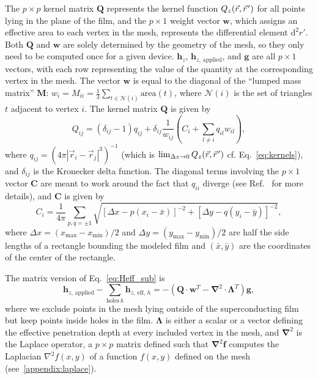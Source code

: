 \documentclass[final,3p,times,twocolumn]{elsarticle}
\newcommand{\pvec}[1]{\vec{#1}\mkern2mu\vphantom{#1}}
\newcounter{bla}
\begin{document}
The $p\times p$ kernel matrix $\mathbf{Q}$ represents the kernel function $Q_z(\vec{r},\pvec{r}')$ for all points lying in the plane of the film, and the $p\times 1$ weight vector $\mathbf{w}$, which assigns an effective area to each vertex in the mesh, represents the differential element $\mathrm{d}^2r'$. Both $\mathbf{Q}$ and $\mathbf{w}$ are solely determined by the geometry of the mesh, so they only need to be computed once for a given device. $\mathbf{h}_z$, $\mathbf{h}_{z,\,\mathrm{applied}}$, and $\mathbf{g}$ are all $p\times 1$ vectors, with each row representing the value of the quantity at the
corresponding vertex in the mesh. The vector $\mathbf{w}$ is equal to the diagonal of the ``lumped mass matrix'' $\mathbf{M}$: $w_i=M_{ii} = \frac{1}{3}\sum_{t\in\mathcal{N}(i)}\mathrm{area}(t)$,
where $\mathcal{N}(i)$ is the set of triangles $t$ adjacent to vertex $i$. The kernel matrix $\mathbf{Q}$ is given by
\begin{equation}
    \label{eq:kernel_matrix}
    Q_{ij} = (\delta_{ij}-1)q_{ij}
    + \delta_{ij}\frac{1}{w_{ij}}\left(C_i + \sum_{l\neq i}q_{il}w_{il}\right),
\end{equation}
where $q_{ij} = \left(4\pi|\vec{r}_i-\vec{r}_j|^3\right)^{-1}$
(which is $\lim_{\Delta z\to 0}Q_z(\vec{r},\pvec{r}')$ cf. Eq.~\ref{eq:kernels}),
and $\delta_{ij}$ is the Kronecker delta function. The diagonal terms involving the $p\times 1$ vector $\mathbf{C}$ are meant to work around the fact that $q_{ii}$ diverge (see Ref.~\cite{Brandt2005-wj} for more details), and $\mathbf{C}$ is given by
\begin{equation}
    \label{eq:C_vector}
    C_i = \frac{1}{4\pi}\sum_{p,q=\pm1}\sqrt{[\Delta x - p(x_i-\bar{x})]^{-2} + [\Delta y - q(y_i-\bar{y})]^{-2}},
\end{equation}
where $\Delta x=(x_\mathrm{max}-x_\mathrm{min})/2$ and $\Delta y=(y_\mathrm{max}-y_\mathrm{min})/2$ are half the side lengths of a rectangle bounding the modeled film and $(\bar{x}, \bar{y})$ are the coordinates of the center of the rectangle.

The matrix version of Eq.~\ref{eq:Heff_sub} is
\begin{equation}
    \label{eq:Heff_sub_num}
     \mathbf{h}_{z,\,\mathrm{applied}} - \sum_{\mathrm{holes}\, h}\mathbf{h}_{z,\,\mathrm{eff},\,h} = -(\mathbf{Q}\cdot\mathbf{w}^T-\mathbf{\nabla}^2\cdot \mathbf{\Lambda}^T)\mathbf{g},
\end{equation}
where we exclude points in the mesh lying outside of the superconducting film but keep points
inside holes in the film. $\mathbf{\Lambda}$ is either a scalar or a vector defining the effective penetration depth at every included vertex in the mesh, and $\mathbf{\nabla}^2$
is the Laplace operator, a $p\times p$ matrix defined such that $\mathbf{\nabla}^2\mathbf{f}$ computes the Laplacian $\nabla^2f(x,y)$ of a function $f(x,y)$ defined on the mesh  (see~\ref{appendix:laplace}).
\end{document}
